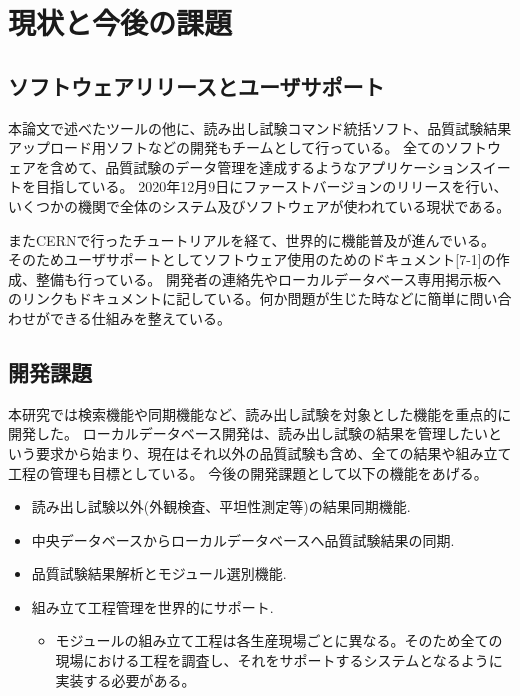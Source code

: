\section{現状と今後の課題}
\subsection{ソフトウェアリリースとユーザサポート}
本論文で述べたツールの他に、読み出し試験コマンド統括ソフト、品質試験結果アップロード用ソフトなどの開発もチームとして行っている。
全てのソフトウェアを含めて、品質試験のデータ管理を達成するようなアプリケーションスイートを目指している。
2020年12月9日にファーストバージョンのリリースを行い、いくつかの機関で全体のシステム及びソフトウェアが使われている現状である。

またCERNで行ったチュートリアルを経て、世界的に機能普及が進んでいる。
そのためユーザサポートとしてソフトウェア使用のためのドキュメント[7-1]の作成、整備も行っている。
開発者の連絡先やローカルデータベース専用掲示板へのリンクもドキュメントに記している。何か問題が生じた時などに簡単に問い合わせができる仕組みを整えている。

\subsection{開発課題}
本研究では検索機能や同期機能など、読み出し試験を対象とした機能を重点的に開発した。
ローカルデータベース開発は、読み出し試験の結果を管理したいという要求から始まり、現在はそれ以外の品質試験も含め、全ての結果や組み立て工程の管理も目標としている。
今後の開発課題として以下の機能をあげる。
\begin{itemize}
  \item 読み出し試験以外(外観検査、平坦性測定等)の結果同期機能.
  \item 中央データベースからローカルデータベースへ品質試験結果の同期.
  \item 品質試験結果解析とモジュール選別機能. 
  \item 組み立て工程管理を世界的にサポート.
  \begin{itemize}
    \item モジュールの組み立て工程は各生産現場ごとに異なる。そのため全ての現場における工程を調査し、それをサポートするシステムとなるように実装する必要がある。
  \end{itemize}
\end{itemize}


